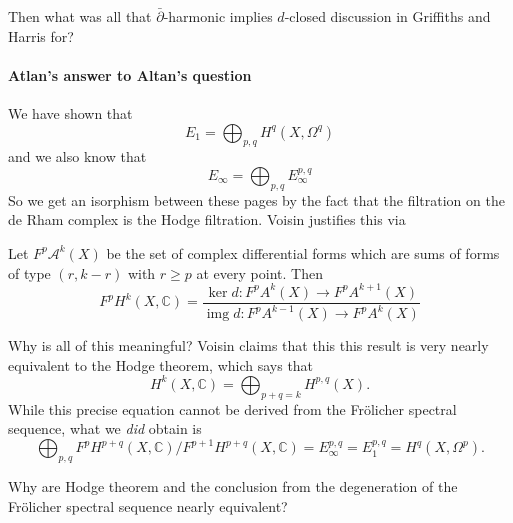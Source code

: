\begin{question}[Dani]
	Then what was all that $\bar\partial$-harmonic implies $d$-closed discussion in Griffiths and Harris for?
\end{question}

\paragraph{Atlan's answer to Altan's question} We have shown that
\[E_1=\bigoplus_{p,q} H^{q}(X,\Omega^q)\]
and we also know that
\[E_\infty=\bigoplus_{p,q} E_\infty^{p,q} \]
So we get an isorphism between these pages by the fact that the filtration on the de Rham complex is the Hodge filtration. Voisin justifies this via 
\begin{prop}[Voisin, 7.5]
Let $F^p\mathcal{A}^k(X)$ be the set of complex differential forms which are sums of forms of type $(r,k-r)$ with $r\geq p$ at every point. Then
\[F^pH^{k}(X,\mathbb{C})=\dfrac{\operatorname{ker} d:F^pA^k(X)\to F^pA^{k+1}(X) }{\operatorname{img} d:F^pA^{k-1}(X)\to F^pA^k(X)}\]
\end{prop}

\begin{remark}
	Why is all of this meaningful? Voisin claims that this this result is very nearly equivalent to the Hodge theorem, which says that
\begin{equation*}\label{eq:hodge-decom}
	 H^{k}(X,\mathbb{C})=\bigoplus_{p+q=k} H^{p,q}(X).
\end{equation*}
While this precise equation cannot be derived from the Fr\"olicher spectral sequence, what we \textit{did} obtain is
\[\bigoplus_{p,q}F^pH^{p+q}(X,\mathbb{C})/F^{p+1}H^{p+q}(X,\mathbb{C})=E^{p,q}_{\infty}=E^{p,q}_{1}=H^q(X,\Omega^p).\]

\begin{question}
	Why are Hodge theorem and the conclusion from the degeneration of the Fr\"olicher spectral sequence nearly equivalent?
\end{question}
\end{remark}


